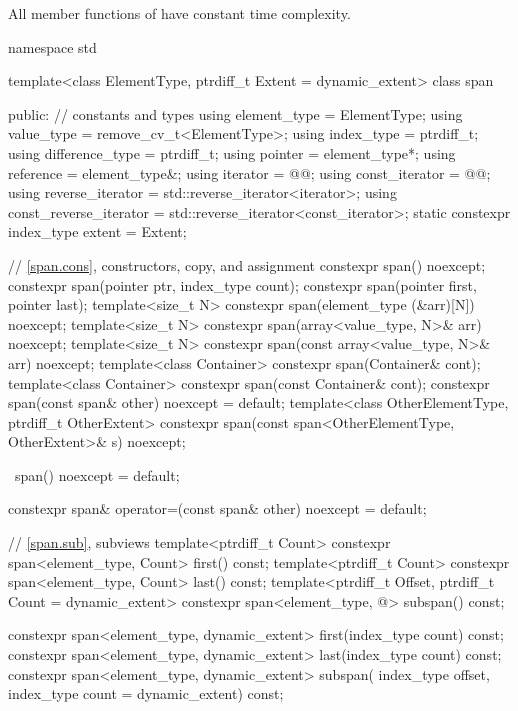 \begin{codeblock}
\begin{codeblock}
\begin{codeblock}
\pnum
All member functions of  have constant time complexity.

%
\begin{codeblock}
namespace std {
  template<class ElementType, ptrdiff_t Extent = dynamic_extent>
  class span {
  public:
    // constants and types
    using element_type = ElementType;
    using value_type = remove_cv_t<ElementType>;
    using index_type = ptrdiff_t;
    using difference_type = ptrdiff_t;
    using pointer = element_type*;
    using reference = element_type&;
    using iterator = @@;
    using const_iterator = @@;
    using reverse_iterator = std::reverse_iterator<iterator>;
    using const_reverse_iterator = std::reverse_iterator<const_iterator>;
    static constexpr index_type extent = Extent;

    // \ref{span.cons}, constructors, copy, and assignment
    constexpr span() noexcept;
    constexpr span(pointer ptr, index_type count);
    constexpr span(pointer first, pointer last);
    template<size_t N>
      constexpr span(element_type (&arr)[N]) noexcept;
    template<size_t N>
      constexpr span(array<value_type, N>& arr) noexcept;
    template<size_t N>
      constexpr span(const array<value_type, N>& arr) noexcept;
    template<class Container>
      constexpr span(Container& cont);
    template<class Container>
      constexpr span(const Container& cont);
    constexpr span(const span& other) noexcept = default;
    template<class OtherElementType, ptrdiff_t OtherExtent>
      constexpr span(const span<OtherElementType, OtherExtent>& s) noexcept;

    ~span() noexcept = default;

    constexpr span& operator=(const span& other) noexcept = default;

    // \ref{span.sub}, subviews
    template<ptrdiff_t Count>
      constexpr span<element_type, Count> first() const;
    template<ptrdiff_t Count>
      constexpr span<element_type, Count> last() const;
    template<ptrdiff_t Offset, ptrdiff_t Count = dynamic_extent>
      constexpr span<element_type, @\seebelow@> subspan() const;

    constexpr span<element_type, dynamic_extent> first(index_type count) const;
    constexpr span<element_type, dynamic_extent> last(index_type count) const;
    constexpr span<element_type, dynamic_extent> subspan(
      index_type offset, index_type count = dynamic_extent) const;

}}
\end{codeblock}
\end{codeblock}
\end{codeblock}
\end{codeblock}
